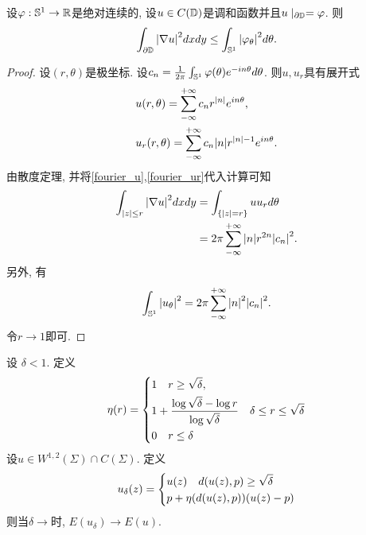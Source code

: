 \begin{lemma} \label{boundary_energy}
    设${\varphi}: \mathbb{S}^1 \to {\mathbb{R}}$是绝对连续的,  设$u\in C({\mathbb{D}})$是调和函数并且$u\mid_{{\partial} {\mathbb{D}}}={\varphi}$. 则
    \begin{equation}
        \int_{{\partial} {\mathbb{D}}} {\left | \nabla u \right |}^2dxdy \le \int_{\mathbb{S}^1} {\left | {\varphi}_\theta \right |}^2d\theta.
    \end{equation}
\end{lemma}
\begin{proof}
    设$(r,\theta)$是极坐标. 设$c_n={{\frac{1}{2\pi}}}\int_{\mathbb{S}^1} {\varphi}(\theta)e^{-i n \theta}d\theta$. 则$u, u_r$具有展开式
    \begin{align}
        &u(r,\theta)=\sum_{-\infty}^{+\infty}c_n r^{{\left | n \right |}}e^{in\theta}, \label{fourier_u} \\
        &u_r(r,\theta)=\sum_{-\infty}^{+\infty}c_n{\left | n \right |} r^{{\left | n \right |}-1}e^{in\theta}. \label{fourier_ur}\\
    \end{align}
    由散度定理, 并将\eqref{fourier_u},\eqref{fourier_ur}代入计算可知
    \begin{equation}
        \begin{split}
            \int_{{{\left | z \right |}\le r}}{\left | \nabla u \right |}^2dxdy & =\int_{\{{\left | z \right |}=r\}}uu_rd\theta\\
            &=2\pi \sum_{-\infty}^{+\infty}{\left | n \right |}r^{2n}{\left | c_n \right |}^2.
        \end{split}
    \end{equation}
    另外, 有
    \begin{equation}
        \int_{\mathbb{S}^1} {\left | u_\theta \right |}^2 = 2\pi\sum_{-\infty}^{+\infty} {\left | n \right |}^2{\left | c_n \right |}^2.
    \end{equation}
    令$r \to 1$即可.
\end{proof}
\begin{lemma} \label{fill_hole}
    设 $\delta <1$. 定义
    \begin{equation}
        \eta(r)=\left\{
            \begin{aligned}
                &1 {\quad} r \ge \sqrt{\delta}, \\
                &1+\frac{\log \sqrt{\delta}- \log r}{ \log \sqrt{\delta}} {\quad} \delta \le r \le \sqrt{\delta}\\
                &0 {\quad} r \le \delta
            \end{aligned}
            \right.
    \end{equation}
    设$u \in W^{1,2}(\Sigma) \cap C(\Sigma)$. 定义
    \begin{equation}
        u_\delta(z)=\left\{
            \begin{aligned}
                & u(z) {\quad} d(u(z), p) \ge \sqrt{\delta} \\
                & p+ \eta(d(u(z),p))(u(z)-p)
            \end{aligned}
        \right.
    \end{equation}
    则当$\delta \to $时, $E(u_\delta) \to E(u)$.
\end{lemma}
